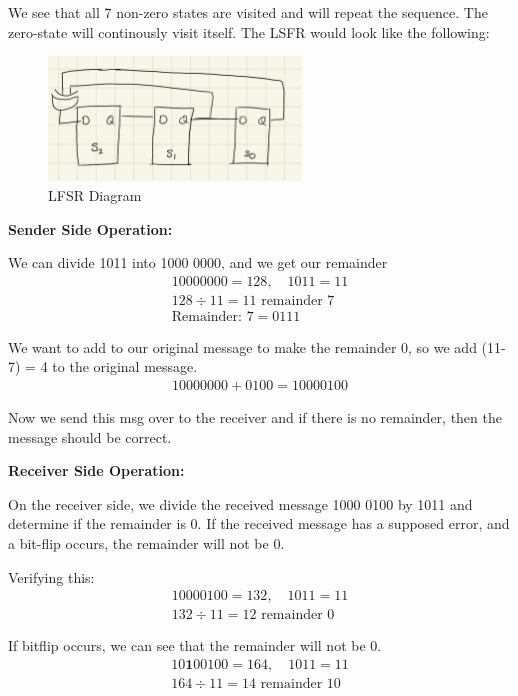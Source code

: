 \documentclass{article}
\begin{document}
We see that all 7 non-zero states are visited and will repeat the sequence. The zero-state will continously visit itself. The LSFR would look like the following:
\begin{figure}[ht!]
    \centering
    \includegraphics[width=0.6\textwidth]{image.png}
    \caption{LFSR Diagram}
\end{figure}

\textbf{Sender Side Operation:}

We can divide 1011 into 1000 0000, and we get our remainder
\begin{align*}
    1000 0000 = 128, \quad 1011 = 11 \\
    128 \div 11 = 11 \text{ remainder } 7 \\
    \text{Remainder: } 7 = 0111
\end{align*} 

We want to add to our original message to make the remainder 0, so we add (11-7) = 4 to the original message.
\begin{align*}
    1000 0000 + 0100 = 1000 0100
\end{align*}

Now we send this msg over to the receiver and if there is no remainder, then the message should be correct.

\textbf{Receiver Side Operation:}

On the receiver side, we divide the received message 1000 0100 by 1011 and determine if the remainder is 0. If the received message has a supposed error, and a bit-flip occurs, the remainder will not be 0.

Verifying this:
\begin{align*}
    1000 0100 = 132, \quad 1011 = 11 \\
    132 \div 11 = 12 \text{ remainder } 0
\end{align*}

If bitflip occurs, we can see that the remainder will not be 0.
\begin{align*}
    10\mathbf{1}0 0100 = 164, \quad 1011 = 11 \\
    164 \div 11 = 14 \text{ remainder } 10
\end{align*}
\end{document}
